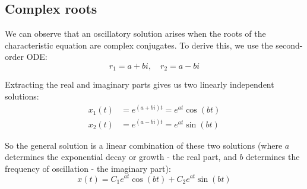 \subsection{Complex roots}



We can observe that an oscillatory solution arises when the roots of the characteristic equation are complex conjugates. To derive this, we use the second-order ODE:
\begin{equation*}
r_1 = a + bi, \quad r_2 = a - bi
\end{equation*}

Extracting the real and imaginary parts gives us two linearly independent solutions:
\begin{align*}
x_1(t) &= e^{(a + bi)t} = e^{a t} \cos(b t) \\
x_2(t) &= e^{(a - bi)t} = e^{a t} \sin(b t)
\end{align*}

So the general solution is a linear combination of these two solutions (where $a$ determines the exponential decay or growth - the real part, and $b$ determines the frequency of oscillation - the imaginary part):
\begin{equation*}
\boxed{
    x(t) = C_1 e^{a t} \cos(b t) + C_2 e^{a t} \sin(b t)
}
\end{equation*}


